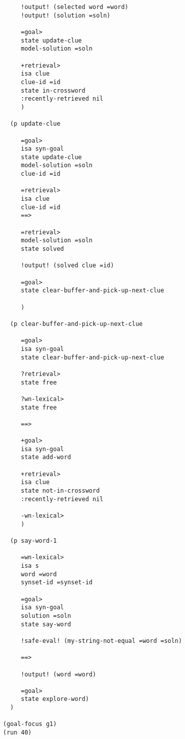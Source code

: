 \begin{verbatim}
     !output! (selected word =word)
     !output! (solution =soln)

     =goal>
     state update-clue
     model-solution =soln
   
     +retrieval>
     isa clue
     clue-id =id
     state in-crossword
     :recently-retrieved nil
     )

  (p update-clue

     =goal>
     isa syn-goal
     state update-clue
     model-solution =soln
     clue-id =id

     =retrieval>
     isa clue
     clue-id =id
     ==>
   
     =retrieval>
     model-solution =soln
     state solved

     !output! (solved clue =id)

     =goal>
     state clear-buffer-and-pick-up-next-clue
   
     )

  (p clear-buffer-and-pick-up-next-clue
   
     =goal>
     isa syn-goal
     state clear-buffer-and-pick-up-next-clue
   
     ?retrieval> 
     state free

     ?wn-lexical>
     state free

     ==>
   
     +goal>
     isa syn-goal
     state add-word

     +retrieval>
     isa clue
     state not-in-crossword
     :recently-retrieved nil

     -wn-lexical>
     )

  (p say-word-1

     =wn-lexical>
     isa s
     word =word
     synset-id =synset-id

     =goal>
     isa syn-goal
     solution =soln
     state say-word

     !safe-eval! (my-string-not-equal =word =soln)

     ==>
   
     !output! (word =word)

     =goal>
     state explore-word)
  )  

(goal-focus g1)
(run 40)

\end{verbatim}
